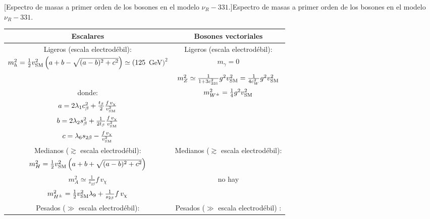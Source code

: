 \begin{center}
[\hspace{-0.125in}Espectro de masas a primer orden de los bosones en el modelo $\nu_R-331$.]{Espectro de masas a primer orden de los bosones en el modelo $\nu_R-331$. }
\begin{small}
\begin{tabular}{|c | c|} 
 \hline
Escalares & Bosones vectoriales \\[1pt]
\hline
Ligeros (escala electrodébil): \hspace{\fill} &  Ligeros (escala electrodébil): \hspace{\fill} \\[10pt]
 $m_h^2=\frac{1}{2}v_{\rm SM}^2 \left(a+b-\sqrt{(a-b)^2+c^2} \right) \simeq ( 125$ GeV$)^2$ & $m_\gamma =0$   \\[5pt] 
 & $m_Z^2 \simeq\frac{1}{1+3c_{331}^2} g^2 v_{\rm SM}^2 =\frac{1}{4c_W^2} g^2 v_{\rm SM}^2 $ \\[5pt]
 donde: \hspace{2.5in}  &  $m_{W^{\pm}}^2 = \frac{1}{4} g^2 v_{\rm SM}^2 $  \\[10pt] 
  $a= 2\lambda_1 c_\beta^2+ \frac{t_\beta}{2}  \frac{f \, v_\chi}{v_{\rm SM}^2}$ \hspace{1.5in}  &  \\[10pt]
  $b=2\lambda_2 s_\beta^2+ \frac{1}{2t_\beta} \frac{f \, v_\chi}{v_{\rm SM}^2} $ \hspace{1.45in}  &   \\[10pt]  
 $c=  \lambda_6 s_{2\beta}-  \frac{f \, v_\chi}{v_{\rm SM}^2}$ \hspace{1.65in} &   \\[10pt]  
\hline 
Medianos ($\gtrsim$ escala electrodébil): \hspace{\fill} & Medianos ($\gtrsim$ escala electrodébil): \hspace{\fill}  \\[10pt]  
$m_H^2=\frac{1}{2}v_{\rm SM}^2 \left(a+b+\sqrt{(a-b)^2+c^2} \right) $ &       \\[10pt]  
$m_A^2 \simeq \frac{1}{s_{2\beta}} f \,v_\chi$ &  no hay   \\[10pt]  
$m_{H^{\pm}}^2= \frac{1}{2}v_{\rm SM}^2 \lambda_9 + \frac{1}{s_{2\beta}} f \,v_\chi $ & \\[10pt]  
 \hline
Pesados ($\gg$ escala electrodébil): \hspace{\fill} & Pesados ($\gg$ escala electrodébil) : \hspace{\fill} \\[10pt]  

\end{tabular}
\end{small}
\end{center}
